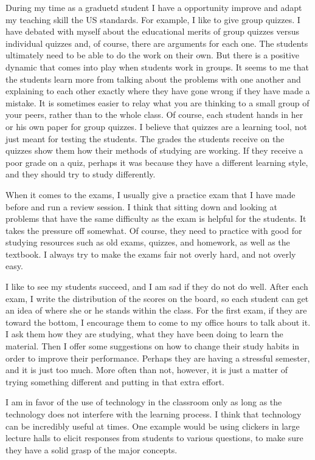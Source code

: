 \documentclass[a4paper, 11pt]{article}
\begin{document}
\begin{small}
During my time as a graduetd student I have a opportunity improve and adapt my teaching skill the US standards. For example,    
I like to give group quizzes. I have debated with myself about the educational merits of group quizzes versus individual quizzes and,
of course, there are arguments for each one.  The students ultimately need to be able to do the work on their own.
But there is a positive dynamic that comes into play when students work in groups.
It seems to me that the students learn more from talking about the problems with one another and explaining to each other exactly where
they have gone wrong if they have made a mistake. It is sometimes easier to relay what you are thinking to a small group of your peers, rather than to the whole class.
Of course, each student hands in her or his own paper for group quizzes.
I believe that quizzes are a learning tool, not just meant for testing the students. 
The grades the students receive on the quizzes show them how their methods of studying are working.
If they receive a poor grade on a quiz, perhaps it was because they have a different learning style, and they should try to study differently.

When it comes to the exams, I usually give a practice exam that I have made before and run a review session.
I think that sitting down and looking at problems that have the same difficulty as the exam is helpful for the students.
It takes the pressure off somewhat. Of course, they need to practice with good for studying resources such as old exams, quizzes, and homework, as well as the textbook.
I always try to make the exams fair not overly hard, and not overly easy.

I like to see my students succeed, and I am sad if they do not do well.
After each exam, I write the distribution of the scores on the board, so each student can get an idea of where she or he stands within the class.
For the first exam, if they are toward the bottom, I encourage them to come to my office hours to talk about it.
I ask them how they are studying, what they have been doing to learn the material.
Then I offer some suggestions on how to change their study habits in order to improve their performance. 
Perhaps they are having a stressful semester, and it is just too much.
More often than not, however, it is just a matter of trying something different and putting in that extra effort.

I am in favor of the use of technology in the classroom only as long as the technology does not interfere with the learning process.
I think that technology can be incredibly useful at times. One example would be using clickers in large lecture halls to elicit
responses from students to various questions, to make sure they have a solid grasp of the major concepts. 


\end{small}
\end{document}
